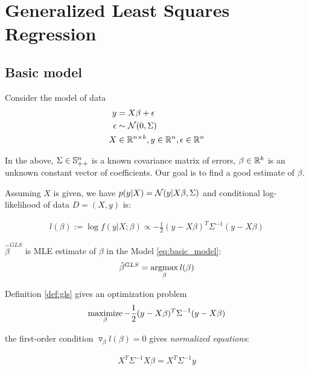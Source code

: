 \section{Generalized Least Squares Regression}
\subsection{Basic model}
Consider the model of data
\begin{equation}
\begin{aligned}
	\label{eq:basic_model}
	y &= X \beta + \epsilon  \\ 	
	\epsilon &\sim \mathcal{N}(0, \Sigma) \\
	X &\in \mathbb{R}^{n \times k}, y \in \mathbb{R}^n, \epsilon \in \mathbb{R}^n 
\end{aligned}
\end{equation}

In the above, $\Sigma \in \mathbb{S}_{++}^n$ is a known covariance matrix of errors, $\beta \in \mathbb{R}^k$ is an unknown constant vector of coefficients.  Our goal is to find a good estimate of $\beta$.

Assuming $X$ is given, we have $p(y|X) = \mathcal{N}(y| X\beta, \Sigma)$ and conditional log-likelihood of data $D=(X,y)$ is:


\begin{align*}
	l(\beta) := \log f(y|X; \beta) \propto -\frac{1}{2} (y - X\beta)^T \Sigma^{-1} (y - X \beta)
\end{align*}

\begin{definition}
	\label{def:gls}
	$\hat{\beta}^{GLS}$ is MLE estimate of $\beta$ in the Model \ref{eq:basic_model}: 
	\begin{align}
	\hat{\beta}^{GLS} = \operatorname*{argmax}_\beta  l(\beta)
	\end{align} 
\end{definition}

Definition \autoref{def:gls} gives an optimization problem
\begin{align}
	\label{eq:gls_opt_problem}
	\operatorname*{maximize}_{\beta} -\frac{1}{2} (y - X\beta)^T \Sigma^{-1} (y - X \beta)
\end{align}

the first-order condition $\triangledown_{\beta} l(\beta) = 0$ gives \textit{normalized equations}:

\begin{align*}
	X^T \Sigma^{-1} X \beta = X^T \Sigma^{-1} y 
\end{align*}

